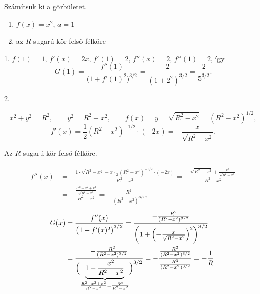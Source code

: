 \documentclass[11pt]{article}
\begin{document}
\begin{exbox}
\begin{example}
Számítsuk ki a görbületet.
\begin{enumerate}[label=\arabic*., itemsep=2pt]
\item $f(x)=x^{2}$, $a=1$
\item az $R$ sugarú kör felső félköre
\end{enumerate}
\end{example}
\end{exbox}
\begin{solution}
1. $f(1)=1$, $f'(x)=2x$, $f'(1)=2$, $f''(x)=2$, $f''(1)=2$, így
\[
G(1)=\frac{f''(1)}{\bigl(1+f'(1)^{2}\bigr)^{3/2}}=\frac{2}{(1+2^{2})^{3/2}}=\frac{2}{5^{3/2}}.
\]

2.

\[
x^{2}+y^{2}=R^{2},\qquad y^{2}=R^{2}-x^{2},\qquad f(x)=y=\sqrt{R^{2}-x^{2}}=(R^{2}-x^{2})^{1/2},
\]
\[
f'(x)=\frac{1}{2}(R^{2}-x^{2})^{-1/2}\cdot(-2x)=-\frac{x}{\sqrt{R^{2}-x^{2}}}.
\]

\begin{notefig}{Az $R$ sugarú kör felső félköre.}
\end{notefig}

\begin{align*}
f''(x)&=-\frac{1\cdot\sqrt{R^{2}-x^{2}}-x\cdot\frac{1}{2}(R^{2}-x^{2})^{-1/2}\cdot(-2x)}{R^{2}-x^{2}}
=-\frac{\sqrt{R^{2}-x^{2}}+\frac{x^{2}}{\sqrt{R^{2}-x^{2}}}}{R^{2}-x^{2}}\\
&=-\frac{\frac{R^{2}-x^{2}+x^{2}}{\sqrt{R^{2}-x^{2}}}}{R^{2}-x^{2}}
=-\frac{R^{2}}{(R^{2}-x^{2})^{3/2}},
\end{align*}
\begin{align*}
G(x)&=\frac{f''(x)}{\bigl(1+f'(x)^{2}\bigr)^{3/2}}
=\frac{-\frac{R^{2}}{(R^{2}-x^{2})^{3/2}}}{\left(1+\left(-\frac{x}{\sqrt{R^{2}-x^{2}}}\right)^{2}\right)^{3/2}}\\
&=\frac{-\frac{R^{2}}{(R^{2}-x^{2})^{3/2}}}{\Bigl(\underbrace{1+\frac{x^{2}}{R^{2}-x^{2}}}_{\frac{R^{2}-x^{2}+x^{2}}{R^{2}-x^{2}}=\frac{R^{2}}{R^{2}-x^{2}}}\Bigr)^{3/2}}
=-\frac{\frac{R^{2}}{(R^{2}-x^{2})^{3/2}}}{\frac{R^{3}}{(R^{2}-x^{2})^{3/2}}}=-\frac{1}{R}.
\end{align*}
\end{solution}
\end{document}
